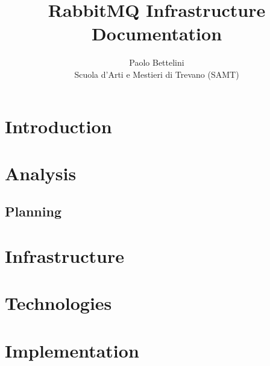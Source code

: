\documentclass[a4paper]{article}
\title{%
    RabbitMQ Infrastructure \\
    \large Documentation
}
\author{%
    Paolo Bettelini \\
    \large Scuola d'Arti e Mestieri di Trevano (SAMT)}
\date{}
\begin{document}
\maketitle

\pagebreak

\tableofcontents

\pagebreak

\section{Introduction}



\pagebreak

\section{Analysis}



\pagebreak

\begin{landscape}
    
    \section{Planning}
    
    

\end{landscape}

\pagebreak

\section{Infrastructure}



\pagebreak

\section{Technologies}



\pagebreak

\section{Implementation}


\end{document}
